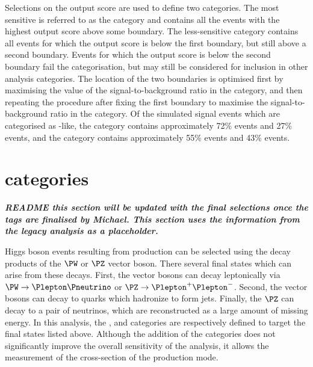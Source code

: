 Selections on the \DiPhoDiJetBdt output score are used to define two \VBFTag categories. The most sensitive is referred to as the  category and contains all the events with the highest \DiPhoDiJetBdt output score above some boundary. The less-sensitive  category contains all events for which the \DiPhoDiJetBdt output score is below the first boundary, but still above a second boundary. Events for which the \DiPhoDiJetBdt output score is below the second boundary fail the \VBFTag categorisation, but may still be considered for inclusion in other analysis categories. %
The location of the two boundaries is optimised first by maximising the value of the signal-to-background ratio in the  category, and then repeating the procedure after fixing the first boundary to maximise the signal-to-background ratio in the  category. Of the simulated signal events which are categorised as \VBF-like, the  category contains approximately 72\% \VBF events and 27\% \ggH events, and the  category contains approximately 55\% \VBF events and 43\% \ggH events. 


\section{\VHTag categories}
\label{cat:sec:vhtag}

\emph{\textbf{README this section will be updated with the final selections once the tags are finalised by Michael. This section uses the information from the legacy analysis as a placeholder.}}

Higgs boson events resulting from \VH production can be selected using the decay products of the $\PW$ or $\PZ$ vector boson. There several final states which can arise from these decays. First, the vector bosons can decay leptonically via $\PW \rightarrow \Plepton \Pneutrino$ or $\PZ \rightarrow \Plepton^{+} \Plepton^{-}$. Second, the vector bosons can decay to quarks which hadronize to form jets. Finally, the $\PZ$ can decay to a pair of neutrinos, which are reconstructed as a large amount of missing energy. In this analysis, the \VHLeptonicTag, \VHHadronicTag and \VHMETTag categories are respectively defined to target the final states listed above. Although the addition of the \VHTag categories does not significantly improve the overall sensitivity of the analysis, it allows the measurement of the cross-section of the \VH production mode. 

